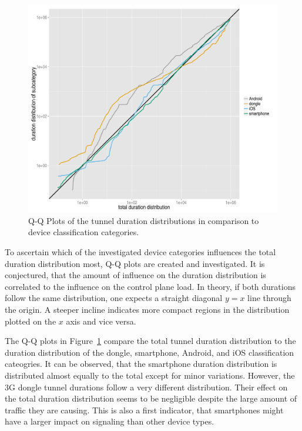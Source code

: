\begin{figure}[htb]
	\centering
	\includegraphics[width=1.0\textwidth]{images/R-duration-qq-category-comparison.pdf}
	\caption{Q-Q Plots of the tunnel duration distributions in comparison to device classification categories.}
\label{c4:fig:qq-plots}
\end{figure}


To ascertain which of the investigated device categories influences the total duration distribution most, Q-Q plots are created and investigated. It is conjectured, that the amount of influence on the duration distribution is correlated to the influence on the control plane load. In theory, if both durations follow the same distribution, one expects a straight diagonal $y=x$ line through the origin. A steeper incline indicates more compact regions in the distribution plotted on the $x$ axis and vice versa.

The Q-Q plots in Figure~\ref{c4:fig:qq-plots} compare the total tunnel duration distribution to the duration distribution of the dongle, smartphone, Android, and iOS classification cateogries. It can be observed, that the smartphone duration distribution is distributed almost equally to the total except for minor variations. However, the \gls{3G} dongle tunnel durations follow a very different distribution. Their effect on the total duration distribution seems to be negligible despite the  large amount of traffic they are causing. This is also a first indicator, that smartphones might have a larger impact on signaling than other device types.

